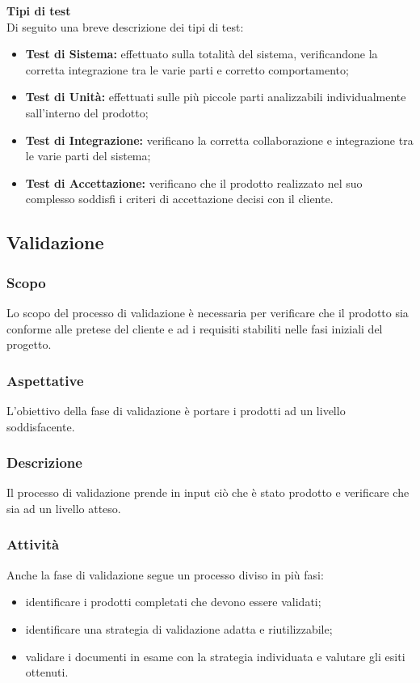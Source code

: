 	\textbf{Tipi di test}\\
	Di seguito una breve descrizione dei tipi di test:
	\begin{itemize}
		\item \textbf{Test di Sistema:} effettuato sulla totalità del sistema, verificandone la corretta integrazione tra le varie parti e corretto comportamento;
		\item \textbf{Test di Unità:} effettuati sulle più piccole parti analizzabili individualmente sall'interno del prodotto;
		\item \textbf{Test di Integrazione:} verificano la corretta collaborazione e integrazione tra le varie parti del sistema;
		\item \textbf{Test di Accettazione:} verificano che il prodotto realizzato nel suo complesso soddisfi i criteri di accettazione decisi con il cliente.
	\end{itemize}
\subsection{Validazione} 
    \subsubsection{Scopo}
    Lo scopo del processo di validazione è necessaria per verificare che il prodotto sia conforme alle pretese del cliente e ad i requisiti stabiliti nelle fasi iniziali del progetto.
    \subsubsection{Aspettative}
    L'obiettivo della fase di validazione è portare i prodotti ad un livello soddisfacente.
    \subsubsection{Descrizione}
    Il processo di validazione prende in input ciò che è stato prodotto e verificare che sia ad un livello atteso.
    \subsubsection{Attività}
    Anche la fase di validazione segue un processo diviso in più fasi:
    \begin{itemize}
    	\item identificare i prodotti completati che devono essere validati;
    	\item identificare una strategia di validazione adatta e riutilizzabile;
    	\item validare i documenti in esame con la strategia individuata e valutare gli esiti ottenuti.
    \end{itemize}
    


